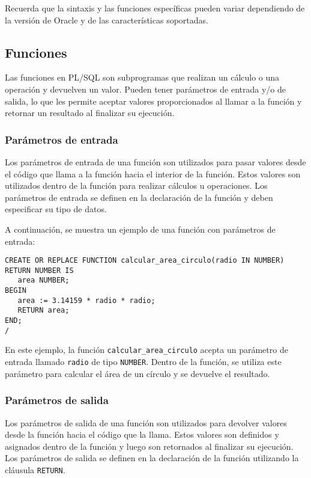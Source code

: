\documentclass[executivepaper]{article}
\begin{document}
Recuerda que la sintaxis y las funciones específicas pueden variar dependiendo de la versión de Oracle y de las características soportadas.

\subsection{Funciones}

Las funciones en PL/SQL son subprogramas que realizan un cálculo o una operación y devuelven un valor. Pueden tener parámetros de entrada y/o de salida, lo que les permite aceptar valores proporcionados al llamar a la función y retornar un resultado al finalizar su ejecución.

\subsubsection*{Parámetros de entrada}

Los parámetros de entrada de una función son utilizados para pasar valores desde el código que llama a la función hacia el interior de la función. Estos valores son utilizados dentro de la función para realizar cálculos u operaciones. Los parámetros de entrada se definen en la declaración de la función y deben especificar su tipo de datos.

A continuación, se muestra un ejemplo de una función con parámetros de entrada:

\begin{lstlisting}
CREATE OR REPLACE FUNCTION calcular_area_circulo(radio IN NUMBER) RETURN NUMBER IS
   area NUMBER;
BEGIN
   area := 3.14159 * radio * radio;
   RETURN area;
END;
/
\end{lstlisting}

En este ejemplo, la función \texttt{calcular\_area\_circulo} acepta un parámetro de entrada llamado \texttt{radio} de tipo \texttt{NUMBER}. Dentro de la función, se utiliza este parámetro para calcular el área de un círculo y se devuelve el resultado.

\subsubsection*{Parámetros de salida}

Los parámetros de salida de una función son utilizados para devolver valores desde la función hacia el código que la llama. Estos valores son definidos y asignados dentro de la función y luego son retornados al finalizar su ejecución. Los parámetros de salida se definen en la declaración de la función utilizando la cláusula \texttt{RETURN}.
\end{document}

